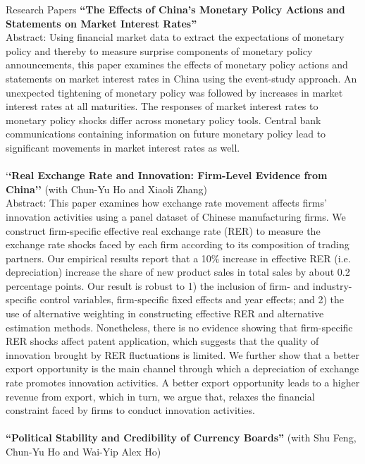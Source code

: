 \documentclass{resume_liang} %
\begin{document}
\begin{rSection}{Research Papers}
\textbf{``The Effects of China's Monetary Policy Actions and Statements on Market Interest Rates''}\\
Abstract: Using financial market data to extract the expectations of monetary policy and thereby to measure surprise components of monetary policy announcements, this paper examines the effects of monetary policy actions and statements on market interest rates in China using the event-study approach. An unexpected tightening of monetary policy was followed by increases in market interest rates at all maturities. The responses of market interest rates to monetary policy shocks differ across monetary policy tools. Central bank communications containing information on future monetary policy lead to significant movements in market interest rates as well.
\\
\\
`\textbf{`Real Exchange Rate and Innovation: Firm-Level Evidence from China''} (with Chun-Yu Ho and Xiaoli Zhang) \\
Abstract: This paper examines how exchange rate movement affects firms' innovation activities using a panel dataset of Chinese manufacturing firms. We construct firm-specific effective real exchange rate (RER) to measure the exchange rate shocks faced by each firm according to its composition of trading partners.  Our empirical results report that a 10\% increase in effective RER (i.e. depreciation) increase the share of new product sales in total sales by about 0.2 percentage points. Our result is robust to 1) the inclusion of firm- and industry-specific control variables, firm-specific fixed effects and year effects; and 2) the use of alternative weighting in constructing effective RER and alternative estimation methods. Nonetheless, there is no evidence showing that firm-specific RER shocks affect patent application, which suggests that the quality of innovation brought by RER fluctuations is limited. We further show that a better export opportunity is the main channel through which a depreciation of exchange rate promotes innovation activities. A better export opportunity leads to a higher revenue from export, which in turn, we argue that, relaxes the financial constraint faced by firms to conduct innovation activities.
\\
\\
\textbf{``Political Stability and Credibility of Currency Boards''} (with Shu Feng, Chun-Yu Ho and Wai-Yip Alex Ho) \\

\end{rSection}
\end{document}
